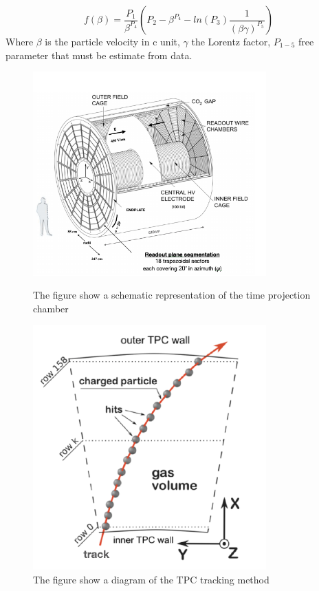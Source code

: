 \documentclass[12pt,a4paper]{book}
\begin{document}
	\begin{equation}
		f(\beta) = \frac{P_1}{\beta^{P_4}} \left(P_2 - \beta^{P_4} -ln(P_3) \frac{1}{(\beta \gamma)^{P_5}} \right)
	\end{equation}
	Where $\beta$ is the particle velocity in c unit, $\gamma$ the Lorentz factor, $P_{1-5}$ free parameter that must be estimate from data.
	\begin{figure}
		\centering
		\begin{minipage}{0.5\textwidth}
			\includegraphics[width=0.8\textwidth]{pictures/time_projection_chamber.png}
			\caption{The figure show a schematic representation of the time projection chamber \cite{Dellacasa:451098}}
			\label{fig:time_projection_chamber}
			
		\end{minipage}
		\begin{minipage}{0.45\textwidth}
			\includegraphics[width=0.8\textwidth]{pictures/TPC_traking.png}
			\caption{The figure show a diagram of the TPC tracking method \cite{Rohr_2012}}
			\label{fig:CA_track}
		\end{minipage}%
	\end{figure}
	
\end{document}
